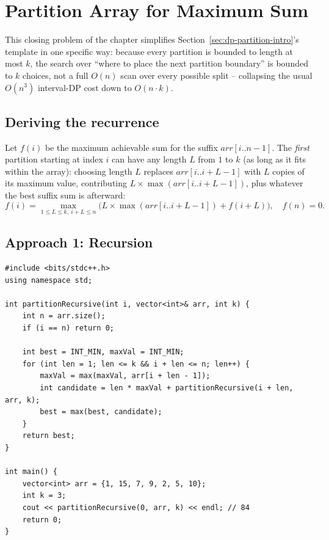 \section{Partition Array for Maximum Sum}
\label{sec:dp-partition-max-sum}


\begin{patternbox}
This closing problem of the chapter simplifies
Section~\ref{sec:dp-partition-intro}'s template in one specific way:
because every partition is bounded to length at most $k$, the search
over ``where to place the next partition boundary'' is bounded to $k$
choices, not a full $O(n)$ scan over every possible split -- collapsing
the usual $O(n^3)$ interval-DP cost down to $O(n \cdot k)$.
\end{patternbox}

\subsection*{Deriving the recurrence}

Let $f(i)$ be the maximum achievable sum for the suffix
$\textit{arr}[i..n{-}1]$. The \emph{first} partition starting at index
$i$ can have any length $L$ from $1$ to $k$ (as long as it fits within
the array): choosing length $L$ replaces $\textit{arr}[i..i{+}L{-}1]$
with $L$ copies of its maximum value, contributing
$L \times \max(\textit{arr}[i..i{+}L{-}1])$, plus whatever the best
suffix sum is afterward:
\[
  f(i) = \max_{1 \le L \le k,\ i+L \le n} \Big( L \times
  \max(\textit{arr}[i..i{+}L{-}1]) + f(i{+}L) \Big), \quad f(n) = 0.
\]

\subsection*{Approach 1: Recursion}

\begin{lstlisting}
#include <bits/stdc++.h>
using namespace std;

int partitionRecursive(int i, vector<int>& arr, int k) {
    int n = arr.size();
    if (i == n) return 0;

    int best = INT_MIN, maxVal = INT_MIN;
    for (int len = 1; len <= k && i + len <= n; len++) {
        maxVal = max(maxVal, arr[i + len - 1]);
        int candidate = len * maxVal + partitionRecursive(i + len, arr, k);
        best = max(best, candidate);
    }
    return best;
}

int main() {
    vector<int> arr = {1, 15, 7, 9, 2, 5, 10};
    int k = 3;
    cout << partitionRecursive(0, arr, k) << endl; // 84
    return 0;
}
\end{lstlisting}

